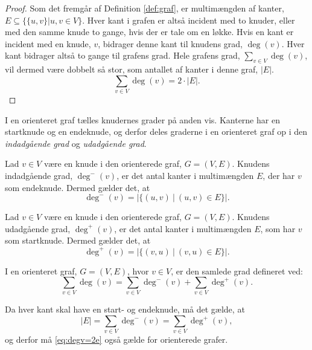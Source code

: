 \begin{proof}
Som det fremgår af Definition \ref{def:graf}, er multimængden af kanter, $E \subseteq \{\{u,v\}|u,v \in V \}$. Hver kant i grafen er altså incident med to knuder, eller med den samme knude to gange, hvis der er tale om en løkke. Hvis en kant er incident med en knude, $v$, bidrager denne kant til knudens grad, $\deg(v)$. Hver kant bidrager altså to gange til grafens grad. Hele grafens grad, $\sum_{v \in V} { } \deg(v)$, vil dermed være dobbelt så stor, som antallet af kanter i denne graf, $|E|$. 
\begin{equation}
\sum_{v \in V} { } \deg(v) = 2 \cdot |E|.
\end{equation} 
\end{proof}

I en orienteret graf tælles knudernes grader på anden vis. Kanterne har en startknude og en endeknude, og derfor deles graderne i en orienteret graf op i den \emph{indadgående grad} og \emph{udadgående grad}. 

\begin{defn}
Lad $v \in V$ være en knude i den orienterede graf, $G = (V,E)$. Knudens indadgående grad, $\deg^-(v)$, er det antal kanter i multimængden $E$, der har $v$ som endeknude. Dermed gælder det, at
\begin{equation}
\deg^-(v)=|\{(u,v) \ | \ (u,v) \in E \}|.
\end{equation}
\end{defn}

\begin{defn}
Lad $v \in V$ være en knude i den orienterede graf, $G = (V,E)$. Knudens udadgående grad, $\deg^+(v)$, er det antal kanter i multimængden $E$, som har $v$ som startknude. Dermed gælder det, at
\begin{equation}
\deg^+(v)=|\{(v,u) \ | \ (v,u) \in E \}|.
\end{equation}
\end{defn}

\begin{defn}
I en orienteret graf, $G = (V,E)$, hvor $v \in V$, er den samlede grad defineret ved: 
\begin{equation}
\sum_{v \in V} { } \deg(v) = \sum_{v \in V} { } \deg^{-}(v) + \sum_{v \in V} { } \deg^{+}(v).
\end{equation}
\end{defn}

Da hver kant skal have en start- og endeknude, må det gælde, at 
\begin{equation}
|E|= \sum_{v \in V} { } \deg^{-}(v) = \sum_{v \in V} { } \deg^{+}(v),
\end{equation}
og derfor må \autoref{eq:degv=2e} også gælde for orienterede grafer.

